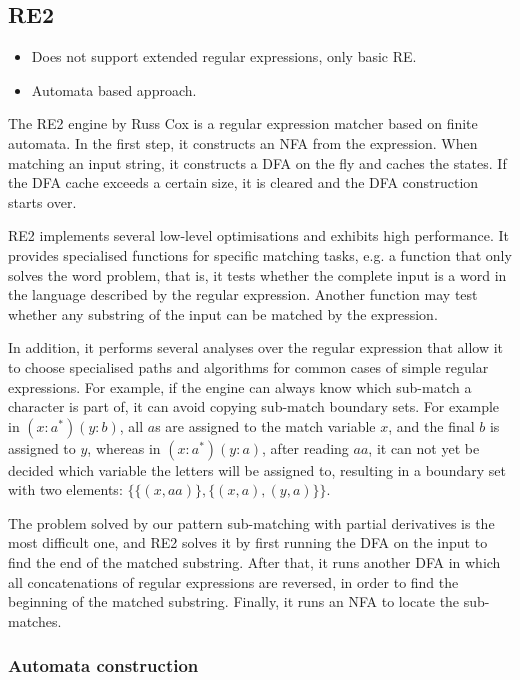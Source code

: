 \subsection{RE2}

\begin{itemize}

   \item Does not support extended regular expressions, only basic RE.

   \item Automata based approach.

\end{itemize}


The RE2 engine by Russ Cox is a regular expression matcher based on finite
automata. In the first step, it constructs an NFA from the expression. When
matching an input string, it constructs a DFA on the fly and caches the states.
If the DFA cache exceeds a certain size, it is cleared and the DFA construction
starts over.

RE2 implements several low-level optimisations and exhibits high performance. It
provides specialised functions for specific matching tasks, e.g. a function that
only solves the word problem, that is, it tests whether the complete input is a
word in the language described by the regular expression. Another function may
test whether any substring of the input can be matched by the expression.

In addition, it performs several analyses over the regular expression that allow
it to choose specialised paths and algorithms for common cases of simple regular
expressions. For example, if the engine can always know which sub-match a
character is part of, it can avoid copying sub-match boundary sets. For example
in $(x:a^*)(y:b)$, all $a$s are assigned to the match variable $x$, and the
final $b$ is assigned to $y$, whereas in $(x:a^*)(y:a)$, after reading $aa$, it
can not yet be decided which variable the letters will be assigned to, resulting
in a boundary set with two elements: $\{\{(x,aa)\},\{(x,a),(y,a)\}\}$.

The problem solved by our pattern sub-matching with partial derivatives is the
most difficult one, and RE2 solves it by first running the DFA on the input to
find the end of the matched substring. After that, it runs another DFA in which
all concatenations of regular expressions are reversed, in order to find the
beginning of the matched substring. Finally, it runs an NFA to locate the
sub-matches.


\subsubsection{Automata construction}


